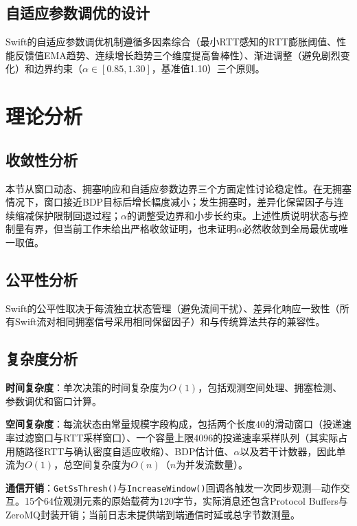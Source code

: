 \subsection{自适应参数调优的设计}

Swift的自适应参数调优机制遵循多因素综合（最小RTT感知的RTT膨胀阈值、性能反馈值EMA趋势、连续增长趋势三个维度提高鲁棒性）、渐进调整（避免剧烈变化）和边界约束（$\alpha \in [0.85, 1.30]$，基准值1.10）三个原则。

\section{理论分析}

\subsection{收敛性分析}

本节从窗口动态、拥塞响应和自适应参数边界三个方面定性讨论稳定性。在无拥塞情况下，窗口接近BDP目标后增长幅度减小；发生拥塞时，差异化保留因子与连续缩减保护限制回退过程；$\alpha$的调整受边界和小步长约束。上述性质说明状态与控制量有界，但当前工作未给出严格收敛证明，也未证明$\alpha$必然收敛到全局最优或唯一取值。

\subsection{公平性分析}

Swift的公平性取决于每流独立状态管理（避免流间干扰）、差异化响应一致性（所有Swift流对相同拥塞信号采用相同保留因子）和与传统算法共存的兼容性。

\subsection{复杂度分析}

\textbf{时间复杂度}：单次决策的时间复杂度为$O(1)$，包括观测空间处理、拥塞检测、参数调优和窗口计算。

\textbf{空间复杂度}：每流状态由常量规模字段构成，包括两个长度40的滑动窗口（投递速率过滤窗口与RTT采样窗口）、一个容量上限4096的投递速率采样队列（其实际占用随路径RTT与确认密度自适应收缩）、BDP估计值、$\alpha$以及若干计数器，因此单流为$O(1)$，总空间复杂度为$O(n)$（$n$为并发流数量）。

\textbf{通信开销}：\texttt{GetSsThresh()}与\texttt{IncreaseWindow()}回调各触发一次同步观测—动作交互。15个64位观测元素的原始载荷为120字节，实际消息还包含Protocol Buffers与ZeroMQ封装开销；当前日志未提供端到端通信时延或总字节数测量。

